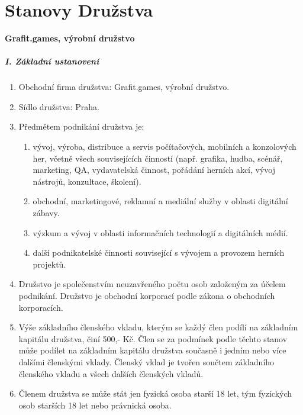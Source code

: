 \chapter{Stanovy Družstva}\label{ap:statutes}
\textbf{\Large Grafit.games, výrobní družstvo}

\paragraph{I. Základní ustanovení}
\begin{enumerate}
    \item Obchodní firma družstva: Grafit.games, výrobní družstvo.
    \item Sídlo družstva: Praha.
    \item Předmětem podnikání družstva je:
        \begin{enumerate}[label=\alph*.]
            \item vývoj, výroba, distribuce a servis počítačových, mobilních a konzolových her, včetně všech souvisejících činností (např. grafika, hudba, scénář, marketing, QA, vydavatelská činnost, pořádání herních akcí, vývoj nástrojů, konzultace, školení).
            \item obchodní, marketingové, reklamní a mediální služby v oblasti digitální zábavy.
            \item výzkum a vývoj v oblasti informačních technologií a digitálních médií.
            \item další podnikatelské činnosti související s vývojem a provozem herních projektů.
        \end{enumerate}
    \item Družstvo je společenstvím neuzavřeného počtu osob založeným za účelem podnikání. Družstvo je obchodní korporací podle zákona o obchodních korporacích.
    \item Výše základního členského vkladu, kterým se každý člen podílí na základním kapitálu družstva, činí 500,- Kč. Člen se za podmínek podle těchto stanov může podílet na základním kapitálu družstva současně i jedním nebo více dalšími členskými vklady. Členský vklad je tvořen součtem základního členského vkladu a všech dalších členských vkladů.
    \item Členem družstva se může stát jen fyzická osoba starší 18 let, tým fyzických osob starších 18 let nebo právnická osoba.

\end{enumerate}
